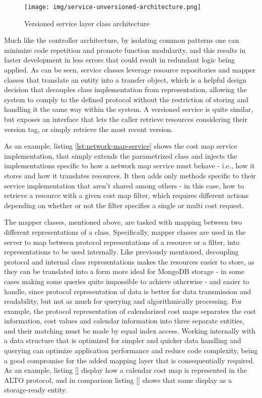 \begin{figure}[ht]
\centering
\texttt{[image: img/service-unversioned-architecture.png]}
\label{fig:controller-unversioned-architecture}
\caption{Versioned service layer class architecture}
\end{figure}

    Much like the controller architecture, by isolating common patterns one can minimize code repetition and promote function modularity, and this results in faster development in less errors that could result in redundant logic being applied.
    As can be seen, service classes leverage resource repositories and mapper classes that translate an entity into a transfer object, which is a helpful design decision that decouples class implementation from representation, allowing the system to comply to the defined protocol without the restriction of storing and handling it the same way within the system.
    A versioned service is quite similar, but exposes an interface that lets the caller retrieve resources considering their version tag, or simply retrieve the most recent version.

    As an example, listing \ref{lst:network-map-service} shows the cost map service implementation, that simply extends the parametrized class and injects the implementations specific to how a network map service must behave - i.e., how it stores and how it translates resources.
    It then adds only methods specific to their service implementation that aren't shared among others - in this case, how to retrieve a resource with a given cost map filter, which requires different actions depending on whether or not the filter specifies a single or multi cost request.

    The mapper classes, mentioned above, are tasked with mapping between two different representations of a class.
    Specifically, mapper classes are used in the server to map between protocol representations of a resource or a filter, into representations to be used internally.
    Like previously mentioned, decoupling protocol and internal class representations makes the resources easier to store, as they can be translated into a form more ideal for MongoDB storage - in some cases making some queries quite impossible to achieve otherwise - and easier to handle, since protocol representation of data is better for data transmission and readability, but not as much for querying and algorithmically processing.
    For example, the protocol representation of calendarized cost maps separates the cost information, cost values and calendar information into three separate entities, and their matching must be made by equal index access.
    Working internally with a data structure that is optimized for simpler and quicker data handling and querying can optimize application performance and reduce code complexity, being a good compromise for the added mapping layer that is consequentially required.
    As an example, listing \ref{} display how a calendar cost map is represented in the ALTO protocol, and in comparison listing \ref{} shows that same display as a storage-ready entity.

